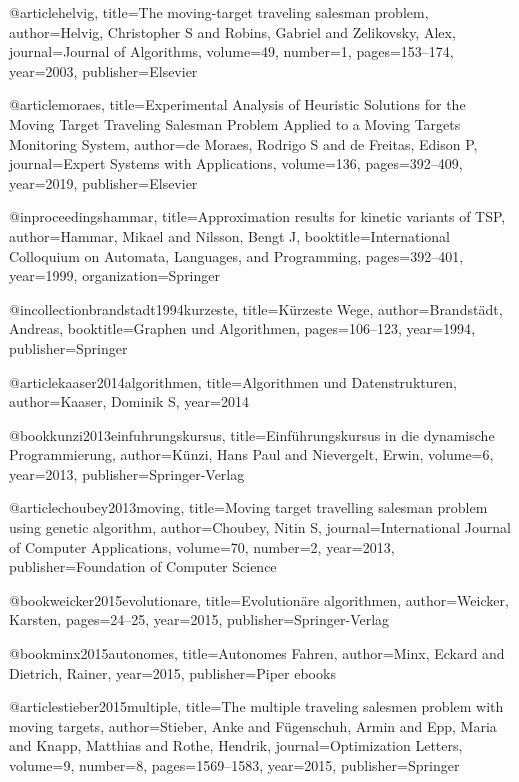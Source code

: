 \documentclass[german,version-2019-11]{uzl-thesis}
\begin{document}
\begin{bibtex-entries}
@article{helvig,
  title={The moving-target traveling salesman problem},
  author={Helvig, Christopher S and Robins, Gabriel and Zelikovsky, Alex},
  journal={Journal of Algorithms},
  volume={49},
  number={1},
  pages={153--174},
  year={2003},
  publisher={Elsevier}
}

@article{moraes,
  title={Experimental Analysis of Heuristic Solutions for the Moving Target Traveling Salesman Problem Applied to a Moving Targets Monitoring System},
  author={de Moraes, Rodrigo S and de Freitas, Edison P},
  journal={Expert Systems with Applications},
  volume={136},
  pages={392--409},
  year={2019},
  publisher={Elsevier}
}

@inproceedings{hammar,
  title={Approximation results for kinetic variants of TSP},
  author={Hammar, Mikael and Nilsson, Bengt J},
  booktitle={International Colloquium on Automata, Languages, and Programming},
  pages={392--401},
  year={1999},
  organization={Springer}
}

@incollection{brandstadt1994kurzeste,
  title={K{\"u}rzeste Wege},
  author={Brandst{\"a}dt, Andreas},
  booktitle={Graphen und Algorithmen},
  pages={106--123},
  year={1994},
  publisher={Springer}
}

@article{kaaser2014algorithmen,
  title={Algorithmen und Datenstrukturen},
  author={Kaaser, Dominik S},
  year={2014}
}

@book{kunzi2013einfuhrungskursus,
  title={Einf{\"u}hrungskursus in die dynamische Programmierung},
  author={K{\"u}nzi, Hans Paul and Nievergelt, Erwin},
  volume={6},
  year={2013},
  publisher={Springer-Verlag}
}

@article{choubey2013moving,
  title={Moving target travelling salesman problem using genetic algorithm},
  author={Choubey, Nitin S},
  journal={International Journal of Computer Applications},
  volume={70},
  number={2},
  year={2013},
  publisher={Foundation of Computer Science}
}

@book{weicker2015evolutionare,
  title={Evolution{\"a}re algorithmen},
  author={Weicker, Karsten},
  pages={24--25},
  year={2015},
  publisher={Springer-Verlag}
}
  
@book{minx2015autonomes,
  title={Autonomes Fahren},
  author={Minx, Eckard and Dietrich, Rainer},
  year={2015},
  publisher={Piper ebooks}
}

@article{stieber2015multiple,
  title={The multiple traveling salesmen problem with moving targets},
  author={Stieber, Anke and F{\"u}genschuh, Armin and Epp, Maria and Knapp, Matthias and Rothe, Hendrik},
  journal={Optimization Letters},
  volume={9},
  number={8},
  pages={1569--1583},
  year={2015},
  publisher={Springer}
}

\end{bibtex-entries}
\end{document}
